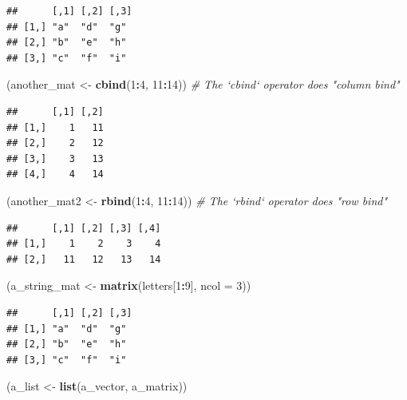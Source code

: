 \documentclass[]{book}
\newenvironment{Shaded}{\begin{snugshade}}{\end{snugshade}}
\newcommand{\CommentTok}[1]{\textcolor[rgb]{0.56,0.35,0.01}{\textit{#1}}}
\newcommand{\DataTypeTok}[1]{\textcolor[rgb]{0.13,0.29,0.53}{#1}}
\newcommand{\DecValTok}[1]{\textcolor[rgb]{0.00,0.00,0.81}{#1}}
\newcommand{\KeywordTok}[1]{\textcolor[rgb]{0.13,0.29,0.53}{\textbf{#1}}}
\newcommand{\NormalTok}[1]{#1}
\newcommand{\OperatorTok}[1]{\textcolor[rgb]{0.81,0.36,0.00}{\textbf{#1}}}
\newcommand{\StringTok}[1]{\textcolor[rgb]{0.31,0.60,0.02}{#1}}
\begin{document}
\begin{enumerate}
\begin{verbatim}
##      [,1] [,2] [,3]
## [1,] "a"  "d"  "g" 
## [2,] "b"  "e"  "h" 
## [3,] "c"  "f"  "i"
\end{verbatim}

\begin{Shaded}
\begin{Highlighting}[]
\NormalTok{(another_mat  <-}\StringTok{ }\KeywordTok{cbind}\NormalTok{(}\DecValTok{1}\OperatorTok{:}\DecValTok{4}\NormalTok{, }\DecValTok{11}\OperatorTok{:}\DecValTok{14}\NormalTok{)) }\CommentTok{# The `cbind` operator does "column bind"}
\end{Highlighting}
\end{Shaded}

\begin{verbatim}
##      [,1] [,2]
## [1,]    1   11
## [2,]    2   12
## [3,]    3   13
## [4,]    4   14
\end{verbatim}

\begin{Shaded}
\begin{Highlighting}[]
\NormalTok{(another_mat2 <-}\StringTok{ }\KeywordTok{rbind}\NormalTok{(}\DecValTok{1}\OperatorTok{:}\DecValTok{4}\NormalTok{, }\DecValTok{11}\OperatorTok{:}\DecValTok{14}\NormalTok{)) }\CommentTok{# The `rbind` operator does "row bind"}
\end{Highlighting}
\end{Shaded}

\begin{verbatim}
##      [,1] [,2] [,3] [,4]
## [1,]    1    2    3    4
## [2,]   11   12   13   14
\end{verbatim}

\begin{Shaded}
\begin{Highlighting}[]
\NormalTok{(a_string_mat <-}\StringTok{ }\KeywordTok{matrix}\NormalTok{(letters[}\DecValTok{1}\OperatorTok{:}\DecValTok{9}\NormalTok{], }\DataTypeTok{ncol =} \DecValTok{3}\NormalTok{))}
\end{Highlighting}
\end{Shaded}

\begin{verbatim}
##      [,1] [,2] [,3]
## [1,] "a"  "d"  "g" 
## [2,] "b"  "e"  "h" 
## [3,] "c"  "f"  "i"
\end{verbatim}

\begin{Shaded}
\begin{Highlighting}[]
\NormalTok{(a_list       <-}\StringTok{ }\KeywordTok{list}\NormalTok{(a_vector, a_matrix))}
\end{Highlighting}
\end{Shaded}


\end{enumerate}
\end{document}

